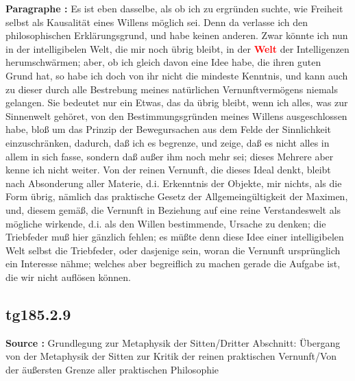 \documentclass[a4paper,12pt,twoside]{book}
\newcommand{\match}[1]{\textcolor{red}{\textbf{#1}}}
\begin{document}
	\noindent\textbf{Paragraphe : }Es ist eben dasselbe, als ob ich zu ergründen suchte, wie Freiheit selbst als Kausalität eines Willens möglich sei. Denn da verlasse ich den philosophischen Erklärungsgrund, und habe keinen anderen. Zwar könnte ich nun in der intelligibelen Welt, die mir noch übrig bleibt, in der \match{Welt} der Intelligenzen herumschwärmen; aber, ob ich gleich davon  eine Idee habe, die ihren guten Grund hat, so habe ich doch von ihr nicht die mindeste Kenntnis, und kann auch zu dieser durch alle Bestrebung meines natürlichen Vernunftvermögens niemals gelangen. Sie bedeutet nur ein Etwas, das da übrig bleibt, wenn ich alles, was zur Sinnenwelt gehöret, von den Bestimmungsgründen meines Willens ausgeschlossen habe, bloß um das Prinzip der Bewegursachen aus dem Felde der Sinnlichkeit einzuschränken, dadurch, daß ich es begrenze, und zeige, daß es nicht alles in allem in sich fasse, sondern daß außer ihm noch mehr sei; dieses Mehrere aber kenne ich nicht weiter. Von der reinen Vernunft, die dieses Ideal denkt, bleibt nach Absonderung aller Materie, d.i. Erkenntnis der Objekte, mir nichts, als die Form übrig, nämlich das praktische Gesetz der Allgemeingültigkeit der Maximen, und, diesem gemäß, die Vernunft in Beziehung auf eine reine Verstandeswelt als mögliche wirkende, d.i. als den Willen bestimmende, Ursache zu denken; die Triebfeder muß hier gänzlich fehlen; es müßte denn diese Idee einer intelligibelen Welt selbst die Triebfeder, oder dasjenige sein, woran die Vernunft ursprünglich ein Interesse nähme; welches aber begreiflich zu machen gerade die Aufgabe ist, die wir nicht auflösen können. 
	
	\subsection*{tg185.2.9} 
	\textbf{Source : }Grundlegung zur Metaphysik der Sitten/Dritter Abschnitt: Übergang von der Metaphysik der Sitten zur Kritik der reinen praktischen Vernunft/Von der äußersten Grenze aller praktischen Philosophie\\  
	
\end{document}
